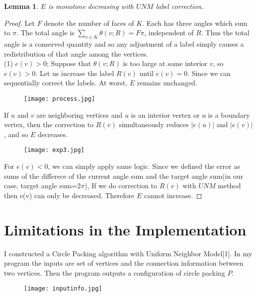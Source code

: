 \documentclass{SOP_KimMoran}
\newtheorem{lemma}{Lemma}
\begin{document}
\begin{lemma}
$E$ is monotone decreasing with $UNM$ label correction.
\end{lemma}
\begin{proof}
  Let $F$ denote the number of faces of $K$. Each has three angles which sum to $\pi$. The total angle is $\sum_{v\in K}\theta(v;R)=F\pi$, independent of $R$. Thus the total angle is a conserved quantity and so any adjustment of a label simply causes a redistribution of that angle among the vertices.\\
(1) $e(v)>0$; Suppose that $\theta(v;R)$ is too large at some interior $v$, so $e(v)>0$. Let us increase the label $R(v)$ until $e(v)=0$. Since we can sequentially correct the labels. At worst, $E$ remains unchanged. 
\begin{figure}[H]
  \texttt{[image: process.jpg]}
\end{figure}
If $u$ and $v$ are neighboring vertices and $u$ is an interior vertex or u is a boundary vertex, then the correction to $R(v)$ simultaneously reduces $|e(u)|$ and $|e(v)|$, and so $E$ decreases.
\begin{figure}[H]
  \texttt{[image: exp3.jpg]}
\end{figure}
  For $e(v)<0$, we can simply apply same logic. Since we defined the error as  sums of the differece of the current angle sum and the target angle sum(in our case, target angle sum=2$\pi$), If we do correction to $R(v)$ with $UNM$ method then e(v) can only be decreased. Therefore $E$ cannot increase.
\end{proof}


\section{Limitations in the Implementation}
I constructed a Circle Packing algorithm with Uniform Neighbor Model[1]. In my program the inputs are set of vertices and the connection information between two vertices. Then the program outputs a configuration of circle packing $P$.
\begin{figure}[H]
  \texttt{[image: inputinfo.jpg]}
\end{figure}
\end{document}
